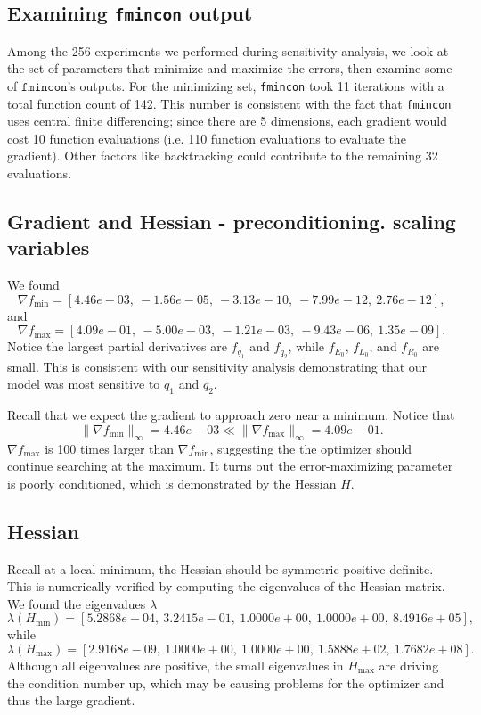 \documentclass[sn-mathphys,Numbered]{sn-jnl}%
\theoremstyle{thmstyleone}%
\theoremstyle{thmstyletwo}%
\theoremstyle{thmstylethree}%
\begin{document}
\subsection{Examining \texttt{fmincon} output}

Among the 256 experiments we performed during sensitivity analysis, we look at the set of parameters that minimize and maximize the errors, then examine some of $\texttt{fmincon}$'s outputs.  For the minimizing set, \texttt{fmincon} took 11 iterations with a total function count of 142.  This number is consistent with the fact that \texttt{fmincon} uses central finite differencing; since there are 5 dimensions, each gradient would cost 10 function evaluations (i.e. 110 function evaluations to evaluate the gradient).  Other factors like backtracking could contribute to the remaining 32 evaluations.

\subsection{Gradient and Hessian - preconditioning. scaling variables} 

We found
$$ \nabla f _{\text{min}} = [4.46e-03,~-1.56e-05,~-3.13e-10,~-7.99e-12,~2.76e-12 ] ,$$ 
and
$$ \nabla f _{\text{max}} = [4.09e-01,~-5.00e-03,~-1.21e-03,~-9.43e-06,~1.35e-09 ] .$$ 
Notice the largest partial derivatives are $f_{q_1}$ and $f_{q_2}$, while $f_{E_0}$, $f_{L_0}$, and $f_{R_0}$ are small.  This is consistent with our sensitivity analysis demonstrating that our model was most sensitive to $q_1$ and $q_2$.

Recall that we expect the gradient to approach zero near a minimum.  Notice that $$\| \nabla f_{\min} \|_\infty = 4.46 e-03 \ll \| \nabla f_{\max} \|_\infty = 4.09 e-01. $$  
$\nabla f_{\max}$ is 100 times larger than $ \nabla f_{\min} $, suggesting the the optimizer should continue searching at the maximum.  It turns out the error-maximizing parameter is poorly conditioned, which is demonstrated by the Hessian $H$.

\subsection{Hessian}

Recall at a local minimum, the Hessian should be symmetric positive definite.  This is numerically verified by computing the eigenvalues of the Hessian matrix.  We found the eigenvalues $\lambda$
$$ \lambda(H_{\min})  = [5.2868e-04,~ 3.2415e-01,~1.0000e+00,~1.0000e+00,~8.4916e+05],$$ 
while
$$ \lambda(H_{\max})  =   [ 2.9168e-09,~1.0000e+00,~1.0000e+00,~1.5888e+02,~1.7682e+08].$$
Although all eigenvalues are positive, the small eigenvalues in $H_{\max}$ are driving the condition number up, which may be causing problems for the optimizer and thus the large gradient.
\end{document}
